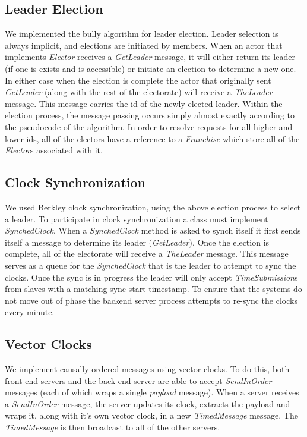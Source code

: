 \documentclass[11pt]{article}
\begin{document}
\subsection{Leader Election}
\label{subsec:leader}

We implemented the bully algorithm for leader election. Leader selection is always implicit, and elections are initiated by members. When an actor that implements \emph{Elector} receives a \emph{GetLeader} message, it will either return its leader (if one is exists and is accessible) or initiate an election to determine a new one. In either case when the election is complete the actor that originally sent \emph{GetLeader} (along with the rest of the electorate) will receive a \emph{TheLeader} message. This message carries the id of the newly elected leader. Within the election process, the message passing occurs simply almost exactly according to the pseudocode of the algorithm. In order to resolve requests for all higher and lower ids, all of the electors have a reference to a \emph{Franchise} which store all of the \emph{Elector}s associated with it. 

\subsection{Clock Synchronization}
\label{subsec:sync}

We used Berkley clock synchronization, using the above election process to select a leader. To participate in clock synchronization a class must implement \emph{SynchedClock}. When a \emph{SynchedClock} method is asked to synch itself it first sends itself a message to determine its leader (\emph{GetLeader}). Once the election is complete, all of the electorate will receive a \emph{TheLeader} message. This message serves as a queue for the \emph{SynchedClock} that is the leader to attempt to sync the clocks. Once the sync is in progress the leader will only accept \emph{TimeSubmission}s from slaves with a matching sync start timestamp. To ensure that the systems do not move out of phase the backend server process attempts to re-sync the clocks every minute. 

\subsection{Vector Clocks}
\label{subsec:vector}
We implement causally ordered messages using vector clocks.  To do
this, both front-end servers and the back-end server are able to
accept \emph{SendInOrder} messages (each of which wraps a single
\emph{payload} message).  When a server receives a \emph{SendInOrder}
message, the server updates its clock, extracts the payload and wraps
it, along with it's own vector clock, in a new \emph{TimedMessage}
message.  The \emph{TimedMessage} is then broadcast to all of the
other servers.
\end{document}
